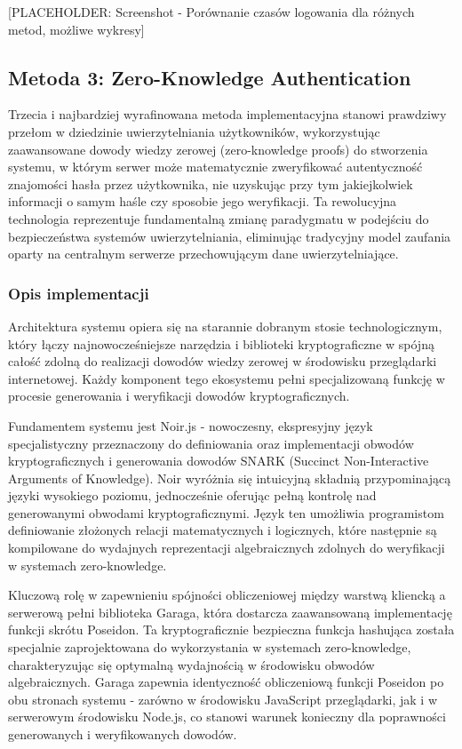 \documentclass{article}
\begin{document}
[PLACEHOLDER: Screenshot - Porównanie czasów logowania dla różnych metod, możliwe wykresy]

\subsection{Metoda 3: Zero-Knowledge Authentication}

Trzecia i najbardziej wyrafinowana metoda implementacyjna stanowi prawdziwy przełom w dziedzinie uwierzytelniania użytkowników, wykorzystując zaawansowane dowody wiedzy zerowej (zero-knowledge proofs) do stworzenia systemu, w którym serwer może matematycznie zweryfikować autentyczność znajomości hasła przez użytkownika, nie uzyskując przy tym jakiejkolwiek informacji o samym haśle czy sposobie jego weryfikacji. Ta rewolucyjna technologia reprezentuje fundamentalną zmianę paradygmatu w podejściu do bezpieczeństwa systemów uwierzytelniania, eliminując tradycyjny model zaufania oparty na centralnym serwerze przechowującym dane uwierzytelniające.

\subsubsection{Opis implementacji}
Architektura systemu opiera się na starannie dobranym stosie technologicznym, który łączy najnowocześniejsze narzędzia i biblioteki kryptograficzne w spójną całość zdolną do realizacji dowodów wiedzy zerowej w środowisku przeglądarki internetowej. Każdy komponent tego ekosystemu pełni specjalizowaną funkcję w procesie generowania i weryfikacji dowodów kryptograficznych.

Fundamentem systemu jest Noir.js - nowoczesny, ekspresyjny język specjalistyczny przeznaczony do definiowania oraz implementacji obwodów kryptograficznych i generowania dowodów SNARK (Succinct Non-Interactive Arguments of Knowledge). Noir wyróżnia się intuicyjną składnią przypominającą języki wysokiego poziomu, jednocześnie oferując pełną kontrolę nad generowanymi obwodami kryptograficznymi. Język ten umożliwia programistom definiowanie złożonych relacji matematycznych i logicznych, które następnie są kompilowane do wydajnych reprezentacji algebraicznych zdolnych do weryfikacji w systemach zero-knowledge.

Kluczową rolę w zapewnieniu spójności obliczeniowej między warstwą kliencką a serwerową pełni biblioteka Garaga, która dostarcza zaawansowaną implementację funkcji skrótu Poseidon. Ta kryptograficznie bezpieczna funkcja hashująca została specjalnie zaprojektowana do wykorzystania w systemach zero-knowledge, charakteryzując się optymalną wydajnością w środowisku obwodów algebraicznych. Garaga zapewnia identyczność obliczeniową funkcji Poseidon po obu stronach systemu - zarówno w środowisku JavaScript przeglądarki, jak i w serwerowym środowisku Node.js, co stanowi warunek konieczny dla poprawności generowanych i weryfikowanych dowodów.
\end{document}

